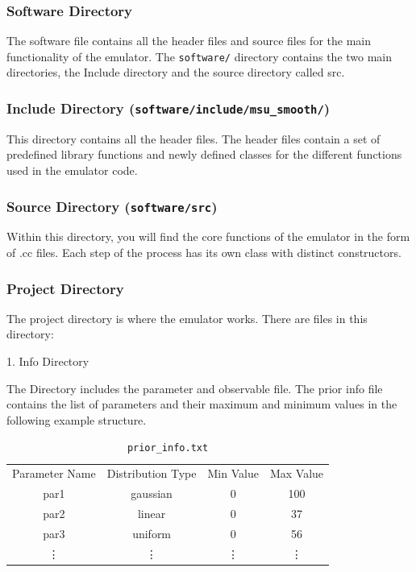 \documentclass[12pt]{article}
\numberwithin{equation}{section}
\numberwithin{figure}{section}
\begin{document}
\subsubsection{Software Directory}

The software file contains all the header files and source files for the main functionality of the emulator. The {\tt software/} directory contains the two main directories, the Include directory and the source directory called src.

\subsubsection{Include Directory ({\tt software/include/msu\_smooth/})}

This directory contains all the header files. The header files contain a set of predefined library functions and newly defined classes for the different functions used in the emulator code. 

\subsubsection{Source Directory ({\tt software/src})}

Within this directory, you will find the core functions of the emulator in the form of .cc files. Each step of the process has its own class with distinct constructors.  

\newpage

\subsubsection{Project Directory}
The project directory is where the emulator works. There are files in this directory: 

1. Info Directory 

The Directory includes the parameter and observable file. 
The prior info file contains the list of parameters and their maximum and minimum values in the following example structure. 

\begin{table}[!h]
    \centering
    \begin{tabular}{c|c|c|c}
         Parameter Name & Distribution Type & Min Value & Max Value \\
         par1 & gaussian & 0 & 100\\
         par2 & linear & 0 & 37 \\
         par3 & uniform & 0 &  56 \\
          \vdots & \vdots & \vdots & \vdots
    \end{tabular}
    \caption{{\tt{prior\_info.txt}}}
    \label{tab:my_label}
\end{table}
 
\end{document}
